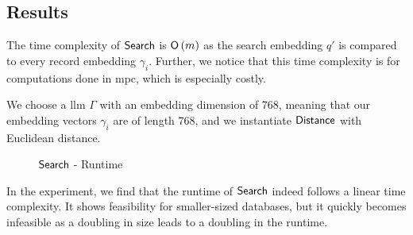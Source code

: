 \subsection*{\thesubsection\quad Results}\label{subsec:SemanticSearchResults}

The time complexity of $ \mathsf{{Search}} $ is $ \mathsf{{O}} \left( m \right) $ as the search embedding $ q' $ is compared to every record embedding $ \gamma_i $. Further, we notice that this time complexity is for computations done in \acrshort{mpc}, which is especially costly.

We choose a \acrshort{llm} $ \Gamma $ with an embedding dimension of 768, meaning that our embedding vectors $ \gamma_i $ are of length 768, and we instantiate $ \mathsf{{Distance}} $ with Euclidean distance.

\begin{figure}[H]
    \caption{$ \mathsf{{Search}} $ - Runtime}
    \label{fig:SemanticSearchRuntime}
    \centering
\end{figure}

In the experiment, we find that the runtime of $ \mathsf{{Search}} $ indeed follows a linear time complexity. It shows feasibility for smaller-sized databases, but it quickly becomes infeasible as a doubling in size leads to a doubling in the runtime.
